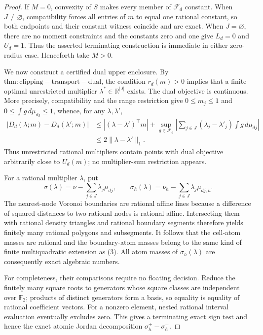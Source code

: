\documentclass{article}
\begin{document}
\begin{proof}
If \(M=0\), convexity of \(S\) makes every member of \(\mathcal F_d\)
constant.  When \(J\neq\varnothing\), compatibility forces all entries of
\(m\) to equal one rational constant, so both endpoints and their constant
witness coincide and are exact.  When \(J=\varnothing\), there are no moment
constraints and the constants zero and one give \(L_d=0\) and \(U_d=1\).
Thus the asserted terminating construction is immediate in either zero-radius
case.  Henceforth take \(M>0\).

We now construct a certified dual upper enclosure.  By
\(\mathrm{thm:clipping-transport-dual}\), the condition \(r_d(m)>0\) implies
that a finite optimal unrestricted multiplier
\(\lambda^*\in\mathbb R^{|J|}\) exists.  The dual objective is continuous.
More precisely, compatibility and the range restriction give
\(0\leq m_j\leq1\) and \(0\leq\int g\,d\mu_{dj}\leq1\), whence, for any
\(\lambda,\lambda'\),
\begin{align}
 |D_d(\lambda;m)-D_d(\lambda';m)|
 &\leq |(\lambda-\lambda')^\top m|
   +\sup_{g\in\mathcal F_d}
       \left|\sum_{j\in J}(\lambda_j-\lambda'_j)
                    \int g\,d\mu_{dj}\right| \\
 &\leq2\|\lambda-\lambda'\|_1.                            \tag{10}
\end{align}
Thus unrestricted rational multipliers contain points with dual objective
arbitrarily close to \(U_d(m)\); no multiplier-sum restriction appears.

For a rational multiplier \(\lambda\), put
\[
 \sigma(\lambda)=\nu-\sum_{j\in J}\lambda_j\mu_{dj},
 \qquad
 \sigma_h(\lambda)=\nu_h-\sum_{j\in J}\lambda_j\mu_{dj,h}.\tag{11}
\]
The nearest-node Voronoi boundaries are rational affine lines because a
difference of squared distances to two rational nodes is rational affine.
Intersecting them with rational density triangles and rational boundary
segments therefore yields finitely many rational polygons and subsegments.
It follows that the cell-atom masses are rational and the boundary-atom masses
belong to the same kind of finite multiquadratic extension as (3).  All atom
masses of \(\sigma_h(\lambda)\) are consequently exact algebraic numbers.

For completeness, their comparisons require no floating decision.  Reduce the
finitely many square roots to generators whose square classes are independent
over \(\mathbb F_2\); products of distinct generators form a basis, so equality
is equality of rational coefficient vectors.  For a nonzero element, nested
rational interval evaluation eventually excludes zero.  This gives a
terminating exact sign test and hence the exact atomic Jordan decomposition
\(\sigma_h^+-\sigma_h^-\).


\end{proof}
\end{document}
